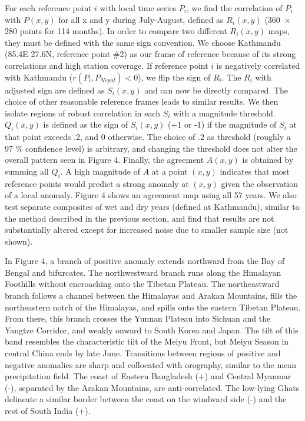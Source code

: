 \documentclass[12pt]{article}
\begin{document}
	For each reference point $i$ with local time series $P_i$, we find the correlation of $P_i$ with $P(x,y)$ for all x and y during July-August, defined as $R_i(x,y)$ (360\ $\times$ 280 points for 114 months). In order to compare two different $R_i(x,y)$ maps, they must be defined with the same sign convention. We choose Kathmandu (85.4\textdegree E 27.6\textdegree N, reference point \#2) as our frame of reference because of its strong correlations and high station coverage. If reference point $i$ is negatively correlated with Kathmandu ($r(P_i,P_{Nepal})<0$), we flip the sign of $R_i$. The $R_i$ with adjusted sign are defined as $S_i(x,y)$ and can now be directly compared. The choice of other reasonable reference frames leads to similar results. We then isolate regions of robust correlation in each $S_i$ with a magnitude threshold. $Q_i(x,y)$ is defined as the sign of $S_i(x,y)$ (+1 or -1) if the magnitude of $S_i$ at that point exceeds .2, and 0 otherwise. The choice of .2 as threshold (roughly a 97 \% confidence level) is arbitrary, and changing the threshold does not alter the overall pattern seen in Figure 4. Finally, the agreement $A(x,y)$ is obtained by summing all $Q_i$. A high magnitude of $A$ at a point $(x,y)$ indicates that most reference points would predict a strong anomaly at $(x,y)$ given the observation of a local anomaly. Figure 4 shows an agreement map using all 57 years. We also test separate composites of wet and dry years (defined at Kathmandu), similar to the method described in the previous section, and find that results are not substantially altered except for increased noise due to smaller sample size (not shown).
		
	In Figure 4, a branch of positive anomaly extends northward from the Bay of Bengal and bifurcates. The northwestward branch runs along the Himalayan Foothills without encroaching onto the Tibetan Plateau. The northeastward branch follows a channel between the Himalayas and Arakan Mountains, fills the northeastern notch of the Himalayas, and spills onto the eastern Tibetan Plateau. From there, this branch crosses the Yunnan Plateau into Sichuan and the Yangtze Corridor, and weakly onward to South Korea and Japan. The tilt of this band resembles the characteristic tilt of the Meiyu Front, but Meiyu Season in central China ends by late June. Transitions between regions of positive and negative anomalies are sharp and collocated with orography, similar to the mean precipitation field. The coast of Eastern Bangladesh (+) and Central Myanmar (-), separated by the Arakan Mountains, are anti-correlated. The low-lying Ghats delineate a similar border between the coast on the windward side (-) and the rest of South India (+). 
	
\end{document}
